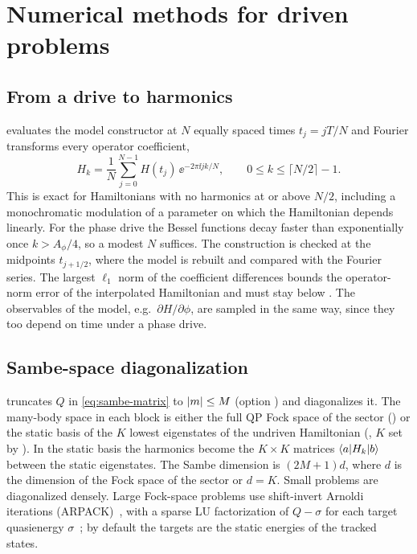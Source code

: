 \chapter{Numerical methods for driven problems}\label{ch:drivenmethods}

\section{From a drive to harmonics}\label{sec:sampling}

 evaluates the model constructor at
$N$ equally spaced times $t_j=jT/N$ and Fourier transforms every operator coefficient,
\begin{equation}\label{eq:fft}
  H_k=\frac1N\sum_{j=0}^{N-1}H(t_j)\,\ee^{-2\pi\ii jk/N},\qquad 0\le k\le\lceil N/2\rceil-1 .
\end{equation}
This is exact for Hamiltonians with no harmonics at or above $N/2$, including a
monochromatic modulation of a parameter on which the Hamiltonian depends linearly. For the phase drive the Bessel functions decay
faster than exponentially once $k>A_\phi/4$, so a modest $N$ suffices. The construction is
checked at the midpoints $t_{j+1/2}$, where the model is rebuilt and compared with the
Fourier series. The largest $\ell_1$ norm of the coefficient differences bounds the
operator-norm error of the interpolated Hamiltonian and must stay below
. The observables of the model, e.g.\ $\partial H/\partial\phi$,
are sampled in the same way, since they too depend on time under a phase drive.

\section{Sambe-space diagonalization}\label{sec:sambe-method}

 truncates $Q$ in \cref{eq:sambe-matrix} to $\lvert m\rvert\le M$ (option
) and diagonalizes it. The many-body space in each block is either the full
QP Fock space of the sector () or the static basis of the $K$ lowest
eigenstates of the undriven Hamiltonian (, $K$ set by
). In the static basis the harmonics become the $K\times K$ matrices
$\langle a\vert H_k\vert b\rangle$ between the static eigenstates. The Sambe dimension is $(2M+1)d$, where
$d$ is the dimension of the Fock space of the sector or $d=K$. Small problems are
diagonalized densely. Large Fock-space problems use shift-invert Arnoldi iterations
(ARPACK)~\cite{lehoucq1998arpack}, with a sparse LU factorization of $Q-\sigma$ for each
target quasienergy $\sigma$~\cite{li2005superlu}; by default the targets are the static
energies of the tracked states.

